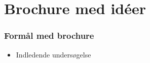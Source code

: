 \section{Brochure med idéer}

\begin{frame}
\frametitle{Formål med brochure}

\begin{itemize}
\item Indledende undersøgelse
\end{itemize}

\end{frame}
